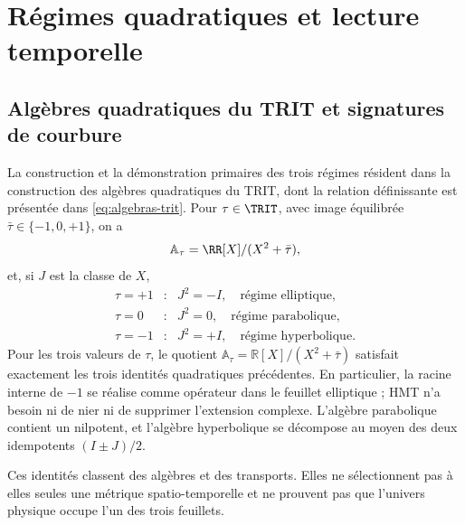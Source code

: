 \section{Régimes quadratiques et lecture temporelle}
\label{v:rec:chap:regimenes-cuadraticos-tiempo}

\subsection{Algèbres quadratiques du TRIT et signatures de courbure}
\label{v:rec:sec:regimenes-cuadraticos-recibidos}

La construction et la démonstration primaires des trois régimes résident dans
la construction des algèbres quadratiques du TRIT,
dont la relation définissante est présentée dans \eqref{eq:algebras-trit}. Pour
\(\tau\in\TRIT\), avec image équilibrée
\(\bar\tau\in\{-1,0,+1\}\), on a
\[
 \mathbb A_\tau=\RR[X]/(X^2+\bar\tau),
\]
et, si \(J\) est la classe de \(X\),
\[
\begin{array}{ccl}
 \tau=+1&:&J^2=-I,\quad\text{régime elliptique},\\
 \tau=0&:&J^2=0,\quad\text{régime parabolique},\\
 \tau=-1&:&J^2=+I,\quad\text{régime hyperbolique}.
\end{array}
\]
Pour les trois valeurs de \(\tau\), le quotient
\(\mathbb A_\tau=\mathbb R[X]/(X^2+\bar\tau)\) satisfait exactement les trois
identités quadratiques précédentes. En particulier, la racine interne de
\(-1\) se réalise comme opérateur dans le feuillet elliptique ; HMT n’a besoin ni de nier ni de
supprimer l’extension complexe. L’algèbre parabolique contient un nilpotent,
et l’algèbre hyperbolique se décompose au moyen des deux idempotents
\((I\pm J)/2\).

Ces identités classent des algèbres et des transports. Elles ne sélectionnent pas à elles
seules une métrique spatio-temporelle et ne prouvent pas que l’univers physique occupe l’un
des trois feuillets.

